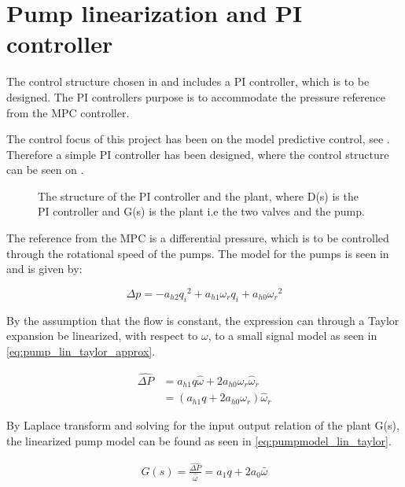 \chapter{Pump linearization and PI controller}
\label{cha:linear_pump2}

The control structure chosen in  and  includes a PI controller, which is to be designed. The PI controllers purpose is to accommodate the pressure reference from the MPC controller. 

The control focus of this project has been on the model predictive control, see . Therefore a simple PI controller has been designed, where the control structure can be seen on .

\begin{figure}[H]
\centering
  
\caption{The structure of the PI controller and the plant, where D(s) is the PI controller and G(s) is the plant i.e the two valves and the pump.}
\label{fig:simple_PI}
\end{figure}

The reference from the MPC is a differential pressure, which is to be controlled through the rotational speed of the pumps. The model for the pumps is seen in  and is given by:

\begin{equation*}
\Delta p = -a_{h2}{q_i}^2 + a_{h1} \omega_r q_i + a_{h0}{\omega_r}^2
\end{equation*}

By the assumption that the flow is constant, the expression can through a Taylor expansion be linearized, with respect to $\omega$, to a small signal model as seen in \eqref{eq:pump_lin_taylor_approx}.


\begin{equation}
	\begin{split}
		\hat{\Delta P} &= a_{h1}q\hat{\omega} + 2a_{h0}{\omega_r}\hat{\omega}_r\\
					   &= (a_{h1}q + 2a_{h0}{\omega_r}) \hat{\omega}_r
	\end{split}
	\label{eq:pump_lin_taylor_approx}
\end{equation}

By Laplace transform and solving for the input output relation of the plant G(s), the linearized pump model can be found as seen in \eqref{eq:pumpmodel_lin_taylor}.

\begin{equation}
	\begin{split}
		G(s) = \frac{\hat{\Delta P}}{\hat{\omega}} = a_1q + 2a_0\bar{\omega}
	\end{split}
	\label{eq:pumpmodel_lin_taylor}
\end{equation}

